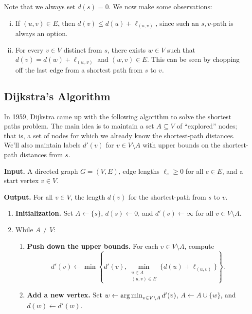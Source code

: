 Note that we always set $d(s) = 0$. We now make some observations: 
\begin{enumerate}[(i)]
    \item If $(u, v) \in E$, then $d(v) \leq d(u) + \ell_{(u,v)}$, since 
    such an $s, v$-path is always an option.
    \item For every $v \in V$ distinct from $s$, there exists $w \in V$ 
    such that $d(v) = d(w) + \ell_{(w, v)}$ and $(w, v) \in E$. This can 
    be seen by chopping off the last edge from a shortest path from $s$ to $v$.
\end{enumerate}

\subsection{Dijkstra's Algorithm}\label{subsec:1.3}
In 1959, Dijkstra came up with the following algorithm to solve the 
shortest paths problem. The main idea is to maintain a set $A \subseteq V$ 
of ``explored'' nodes; that is, a set of nodes for which we already know the 
shortest-path distances. We'll also maintain labels $d'(v)$ for $v \in 
V \setminus A$ with upper bounds on the shortest-path distances from $s$. 

{\bf Input.} A directed graph $G = (V, E)$, edge lengths $\ell_e \geq 0$ for 
all $e \in E$, and a start vertex $v \in V$. 

{\bf Output.} For all $v \in V$, the length $d(v)$ for the shortest-path from 
$s$ to $v$.
\begin{enumerate}[leftmargin=1.75cm, label={Step \arabic*.}]
    \item {\bf Initialization.} Set $A \gets \{s\}$, $d(s) \gets 0$, and $d'(v) \gets \infty$ 
    for all $v \in V \setminus A$.

    \item While $A \neq V$:
    \begin{enumerate}[label={Step 2.\arabic*.}]
        \item {\bf Push down the upper bounds.} For each $v \in V \setminus A$, compute 
        \[ d'(v) \gets \min\left\{ d'(v), \min_{\substack{u\in A \\ (u, v) \in E}} 
        \{ d(u) + \ell_{(u, v)} \} \right\}. \] 
        \item {\bf Add a new vertex.} Set $w \gets \operatorname*{arg\,min}_{v \in V \setminus A} d'(v)$, 
        $A \gets A \cup \{w\}$, and $d(w) \gets d'(w)$. 
    \end{enumerate}
\end{enumerate}

